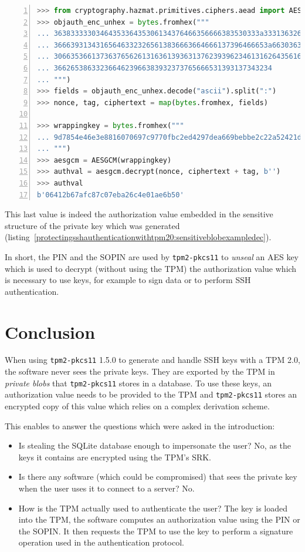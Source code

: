 \begin{lstlisting}[language=Python, numbers=left, caption={Python session which computes the authorization value of a key from the wrapping key}, label=protectingsshauthenticationwithtpm20:authvalderiv]
>>> from cryptography.hazmat.primitives.ciphers.aead import AESGCM
>>> objauth_enc_unhex = bytes.fromhex("""
... 3638333330346435336435306134376466356666383530333a33313632626439
... 366639313431656463323265613836663664666137396466653a663036323866
... 3066353661373637656261316361393631376239396234613162643561653666
... 3662653863323664623966383932373765666531393137343234
... """)
>>> fields = objauth_enc_unhex.decode("ascii").split(":")
>>> nonce, tag, ciphertext = map(bytes.fromhex, fields)

>>> wrappingkey = bytes.fromhex("""
... 9d7854e46e3e8816070697c9770fbc2ed4297dea669bebbe2c22a52421df63cd
... """)
>>> aesgcm = AESGCM(wrappingkey)
>>> authval = aesgcm.decrypt(nonce, ciphertext + tag, b'')
>>> authval
b'06412b67afc87c07eba26c4e01ae6b50'
\end{lstlisting}

This last value is indeed the authorization value embedded in the
sensitive structure of the private key which was generated
(listing~\ref{protectingsshauthenticationwithtpm20:sensitiveblobexampledec}).

In short, the PIN and the SOPIN are used by
\texttt{tpm2-pkcs11} to \emph{unseal} an AES key which
is used to decrypt (without using the TPM) the authorization value which
is necessary to use keys, for example to sign data or to perform SSH
authentication.

\section{Conclusion}

When using \texttt{tpm2-pkcs11} 1.5.0 to generate and
handle SSH keys with a TPM 2.0, the software never sees the private
keys. They are exported by the TPM in \emph{private blobs} that
\texttt{tpm2-pkcs11} stores in a database. To use these
keys, an authorization value needs to be provided to the TPM and
\texttt{tpm2-pkcs11} stores an encrypted copy of this
value which relies on a complex derivation scheme.

This enables to answer the questions which were asked in the
introduction:

\begin{itemize}

\item
  Is stealing the SQLite database enough to impersonate the user? No, as
  the keys it contains are encrypted using the TPM's SRK.
\item
  Is there any software (which could be compromised) that sees the
  private key when the user uses it to connect to a server? No.
\item
  How is the TPM actually used to authenticate the user? The key is
  loaded into the TPM, the software computes an authorization value
  using the PIN or the SOPIN. It then requests the TPM to use the key to
  perform a signature operation used in the authentication protocol.
\end{itemize}


